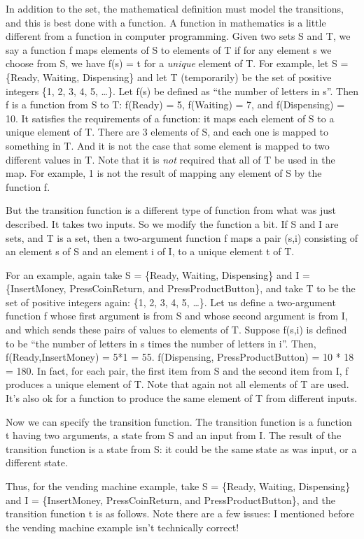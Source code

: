 In addition to the set, the mathematical definition must model the
transitions, and this is best done with a function. A function in
mathematics is a little different from a function in computer
programming. Given two sets S and T, we say a function f maps elements
of S to elements of T if for any element s we choose from S, we have
f(s) = t for a \emph{unique} element of T. For example, let S = \{Ready,
Waiting, Dispensing\} and let T (temporarily) be the set of positive
integers \{1, 2, 3, 4, 5, \ldots{}\}. Let f(s) be defined as ``the
number of letters in s''. Then f is a function from S to T: f(Ready) =
5, f(Waiting) = 7, and f(Dispensing) = 10. It satisfies the requirements
of a function: it maps each element of S to a unique element of T. There
are 3 elements of S, and each one is mapped to something in T. And it is
not the case that some element is mapped to two different values in T.
Note that it is \emph{not} required that all of T be used in the map.
For example, 1 is not the result of mapping any element of S by the
function f.

But the transition function is a different type of function from what
was just described. It takes two inputs. So we modify the function a
bit. If S and I are sets, and T is a set, then a two-argument function f
maps a pair (s,i) consisting of an element s of S and an element i of I,
to a unique element t of T.

For an example, again take S = \{Ready, Waiting, Dispensing\} and I =
\{InsertMoney, PressCoinReturn, and PressProductButton\}, and take T to
be the set of positive integers again: \{1, 2, 3, 4, 5, \ldots{}\}. Let
us define a two-argument function f whose first argument is from S and
whose second argument is from I, and which sends these pairs of values
to elements of T. Suppose f(s,i) is defined to be ``the number of
letters in s times the number of letters in i''. Then,
f(Ready,InsertMoney) = 5*1 = 55. f(Dispensing, PressProductButton) = 10
* 18 = 180. In fact, for each pair, the first item from S and the second
item from I, f produces a unique element of T. Note that again not all
elements of T are used. It's also ok for a function to produce the same
element of T from different inputs.

Now we can specify the transition function. The transition function is a
function t having two arguments, a state from S and an input from I. The
result of the transition function is a state from S: it could be the
same state as was input, or a different state.

Thus, for the vending machine example, take S = \{Ready, Waiting,
Dispensing\} and I = \{InsertMoney, PressCoinReturn, and
PressProductButton\}, and the transition function t is as follows. Note
there are a few issues: I mentioned before the vending machine example
isn't technically correct!

